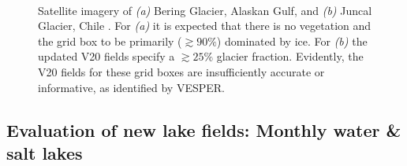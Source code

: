 \documentclass[hess, manuscript]{copernicus}
\begin{document}
	\begin{figure}[h!]
	 \\
	\caption{Satellite imagery of \textit{(a)} Bering Glacier, Alaskan Gulf, and \textit{(b)} Juncal Glacier, Chile . For \textit{(a)} it is expected that there is no vegetation and the grid box to be primarily ($\gtrsim 90 \%$) dominated by ice. For \textit{(b)} the updated V20 fields specify a $\gtrsim 25 \%$  glacier fraction. Evidently, the V20 fields for these grid boxes are insufficiently accurate or informative, as identified by VESPER.} 
	\label{fig:glacier}
\end{figure}


\subsection{Evaluation of new lake fields: Monthly water \& salt lakes}
\end{document}
